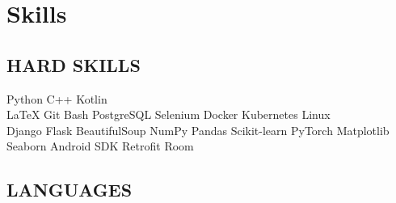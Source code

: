 \documentclass[]{resume}
\begin{document}
\begin{minipage}[t]{0.33\textwidth}

\section{Skills}
\subsection{HARD SKILLS}
Python \textbullet{} C++ \textbullet{} Kotlin \\
\LaTeX \textbullet{} Git \textbullet{} Bash \textbullet{} PostgreSQL \textbullet{} Selenium \textbullet{} Docker \textbullet{} Kubernetes \textbullet{} Linux\\
Django \textbullet{} Flask \textbullet{} BeautifulSoup
\textbullet{} NumPy \textbullet{} Pandas \textbullet{} Scikit-learn \textbullet{} PyTorch \textbullet{} Matplotlib \textbullet{} Seaborn \textbullet{} Android SDK \textbullet{} Retrofit \textbullet{} Room\\
\sectionsep

\subsection{LANGUAGES}
\sectionsep

%
%

\end{minipage} 
\hfill
\end{document}
